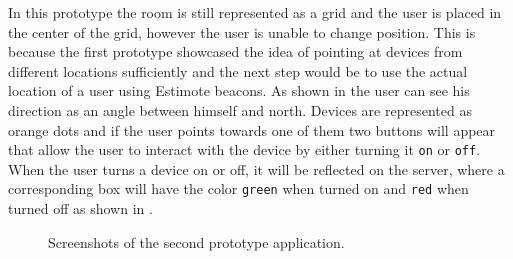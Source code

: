 In this prototype the room is still represented as a grid and the user is placed in the center of the grid, however the user is unable to change position.
This is because the first prototype showcased the idea of pointing at devices from different locations sufficiently and the next step would be to use the actual location of a user using Estimote beacons.
As shown in  the user can see his direction as an angle between himself and north.
Devices are represented as orange dots and if the user points towards one of them two buttons will appear that allow the user to interact with the device by either turning it \texttt{on} or \texttt{off}.
When the user turns a device on or off, it will be reflected on the server, 
where a corresponding box will have the color \texttt{green} when turned on and \texttt{red} when turned off as shown in .

\begin{figure}%
    \centering
    \caption{Screenshots of the second prototype application.}
    \label{fig:prototype2-app-screenshots}
\end{figure}

